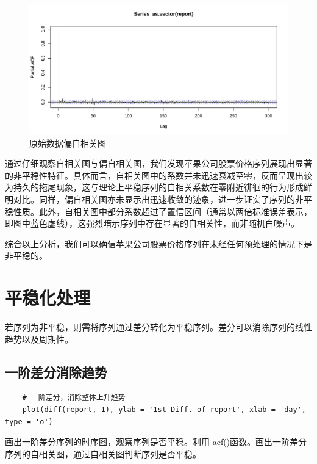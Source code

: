 \documentclass{article} %
\begin{document}
\begin{figure}[h] %
	\centering %
	\includegraphics[width=\textwidth]{pic/pacf.pdf}
    \caption{原始数据偏自相关图} %
	\label{} %
\end{figure}

\FloatBarrier

通过仔细观察自相关图与偏自相关图，我们发现苹果公司股票价格序列展现出显著的非平稳性特征。具体而言，自相关图中的系数并未迅速衰减至零，反而呈现出较为持久的拖尾现象，这与理论上平稳序列的自相关系数在零附近徘徊的行为形成鲜明对比。同样，偏自相关图亦未显示出迅速收敛的迹象，进一步证实了序列的非平稳性质。此外，自相关图中部分系数超过了置信区间（通常以两倍标准误差表示，即图中蓝色虚线），这强烈暗示序列中存在显著的自相关性，而非随机白噪声。

综合以上分析，我们可以确信苹果公司股票价格序列在未经任何预处理的情况下是非平稳的。


\section{平稳化处理}

若序列为非平稳，则需将序列通过差分转化为平稳序列。差分可以消除序列的线性趋势以及周期性。

\subsection{一阶差分消除趋势}

\begin{lstlisting}
    # 一阶差分，消除整体上升趋势
    plot(diff(report, 1), ylab = '1st Diff. of report', xlab = 'day', type = 'o')
\end{lstlisting}

画出一阶差分序列的时序图，观察序列是否平稳。利用 acf()函数。画出一阶差分序列的自相关图，通过自相关图判断序列是否平稳。
\end{document}
